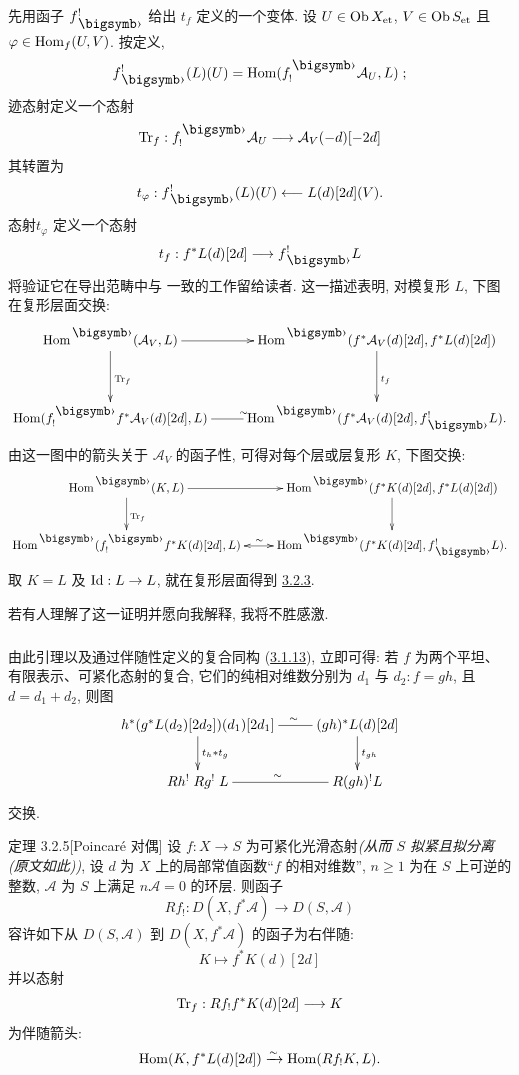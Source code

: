 先用函子 $f^!_\bigdot$  给出 $t_f$ 定义的一个变体. 设 $U\in \operatorname{Ob} X_{\text{\rm et}}$, $V\in \operatorname{Ob} S_{\text{\rm et}}$ 且 $\varphi\in \operatorname{Hom}_{f}(U,V)$. 按定义,
$$
f^{!}_{\bigdot}(L)(U)=\Hom(f^{\bigdot}_{!}\mathcal{A}_{U},L){\quoi}\;;
$$
迹态射定义一个态射
$$
\Tr_{f}:f^{\bigdot}_{!}\mathcal{A}_{U}\longrightarrow
\mathcal{A}_{V}(-d)[-2d]
$$
其转置为
$$
t_{\varphi}:f^{!}_{\bigdot}(L)(U)\longleftarrow L(d)[2d](V){\quoi}.
$$
态射\pageoriginale $t_{\varphi}$ 定义一个态射
$$
t_{f}:f^{\ast}L(d)[2d]\longrightarrow f^{!}_{\bigdot}L
$$
将验证它在导出范畴中与  一致的工作留给读者. 这一描述表明, 对模复形 $L$, 下图在复形层面交换:
$$
\xymatrix@R=1.25cm{
\Hom^{\bigdot}(\Aa_V,L) \ar[r] \ar[d]^{\Tr_f}& \Hom^{\bigdot}(f^{\ast}\Aa_V(d) [2d], f^{\ast}
L(d) [2d])\ar[d]^{t_f}\\
\Hom(f^{\bigdot}_!f^{\ast}\Aa_V(d)[2d],L) \ar@{-}[r]^{\sim}& \Hom^{\bigdot}(f^{\ast}\Aa_V(d)[2d], f^{!}_{\bigdot}L).
}
$$
由这一图中的箭头关于 $\mathcal{A}_{V}$ 的函子性, 可得对每个层或层复形 $K$, 下图交换:
$$
\xymatrix{
\Hom^{\bigdot}(K,L) \ar[r] \ar[d]^{\Tr_f}& \Hom^{\bigdot}(f^{\ast}K(d)[2d],
f^{\ast}L(d)[2d]) \ar[d]\\
\Hom^{\bigdot}(f^{\bigdot}_!f^{\ast}K(d)[2d],L) \ar@{<->}[r]^{\sim} &\Hom^{\bigdot}(f^{\ast}K(d)[2d], f^{!}_{\bigdot}L).
}
$$
取 $K=L$ 及 $\operatorname{Id}:L\rightarrow L$, 就在复形层面得到 \hyperref[XVIII.lem3.2.3]{3.2.3}.

若有人理解了这一证明并愿向我解释, 我将不胜感激.

\setcounter{subsubsection}{3}
\subsubsection{}
由此引理以及通过伴随性定义的复合同构 (\hyperref[XVIII.subsubsec3.1.13]{3.1.13}), 立即可得: 若 $f$ 为两个平坦、有限表示、可紧化态射的复合, 它们的纯相对维数分别为 $d_{1}$ 与 $d_{2}:f=gh$, 且 $d=d_{1}+d_{2}$, 则图
$$
\xymatrix{
h^{\ast}(g^{\ast}L(d_2)[2d_2])(d_1)[2d_1]
\ar@{-}[r]^(.6){\sim}
\ar[d]^{t_h\ast t_g}&(gh)^{\ast}L(d)[2d] \ar[d]^{t_{gh}}\\
Rh^{!} \; Rg^{!} \; L  \ar@{-}[r]^{\sim}&  R(gh)^{!}L
}
$$
\pageoriginale 交换.

\begin{enonce*}{定理 3.2.5}[Poincaré 对偶]%
设 $f:X\rightarrow S$ 为可紧化光滑态射\emph{(从而 $S$ 拟紧且拟分离 (原文如此))}, 设 $d$ 为 $X$ 上的局部常值函数“$f$ 的相对维数”, $n\geq 1$ 为在 $S$ 上可逆的整数, $\mathcal{A}$ 为 $S$ 上满足 $n\mathcal{A}=0$ 的环层. 则函子
$$
Rf_{!}:D(X,f^{\ast}\mathcal{A})\longrightarrow D(S,\mathcal{A})
$$
容许如下从 $D(S,\mathcal{A})$ 到 $D(X,f^{\ast}\mathcal{A})$ 的函子为右伴随:
$$
K\longmapsto f^{\ast}K(d)[2d]
$$
并以态射 
$$
\operatorname{Tr}_{f}:Rf_{!}f^{\ast}K(d)[2d]\longrightarrow K
$$
为伴随箭头:
\hypertarget{sga4.exp.XVIII.equation.3.2.5.1}{}$$
\operatorname{Hom}(K,f^{\ast}L(d)[2d])\xrightarrow{\sim} \operatorname{Hom}(Rf_{!}K,L){}.
$$
\end{enonce*}

